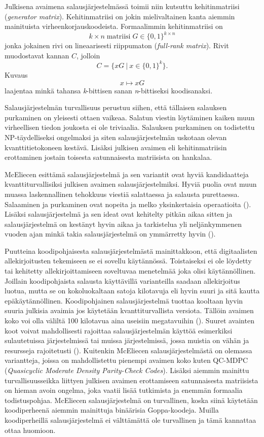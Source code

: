 Julkisena avaimena salausjärjestelmässä toimii niin kutsuttu kehitinmatriisi (\emph{generator matrix}). Kehitinmatriisi on jokin mielivaltainen kanta aiemmin mainituista virheenkorjauskoodeista. Formaalimmin kehitinmatriisi on 
\[k \times n  \; \text{matriisi} \; G \in \big\{0,1\big\}^{k \times n}\]
jonka jokainen rivi on lineaarisesti riippumaton (\emph{full-rank matrix}). Rivit muodostavat kannan $C$, jolloin 
\[C = \big\{ xG \: | \: x \in \big\{0,1\big\}^k \big\}.\]
Kuvaus
\[x \mapsto xG\]
laajentaa minkä tahansa \emph{k}-bittisen sanan \emph{n}-bittiseksi koodisanaksi.

Salausjärjestelmän turvallisuus perustuu siihen, että tällaisen salauksen purkaminen on yleisesti ottaen vaikeaa. Salatun viestin löytäminen kaiken muun virheellisen tiedon joukosta ei ole triviaalia. Salauksen purkaminen on todistettu NP-täydelliseksi ongelmaksi ja siten salausjärjestelmän uskotaan olevan kvanttitietokoneen kestävä. Lisäksi julkisen avaimen eli kehitinmatriisin erottaminen jostain toisesta satunnaisesta matriisista on hankalaa.

McEliecen esittämä salausjärjestelmä ja sen variantit ovat hyviä kandidaatteja kvanttiturvallisiksi julkisen avaimen salausjärjestelmiksi. Hyviä puolia ovat muun muassa laskennallinen tehokkuus viestiä salattaessa ja salausta purettaessa. Salaaminen ja purkaminen ovat nopeita ja melko yksinkertaisia operaatioita (\cite{mavroeidis2018impact}). Lisäksi salausjärjestelmä ja sen ideat ovat kehitelty pitkän aikaa sitten ja salausjärjestelmä on kestänyt hyvin aikaa ja tarkistelua yli neljänkymmenen vuoden ajan minkä takia salausjärjestelmä on ymmärretty hyvin (\cite{8012331}).

Puutteina koodipohjaisesta salausjärjestelmästä mainittakkoon, että digitaalisten allekirjoitusten tekemiseen se ei sovellu käytännössä. Toistaiseksi ei ole löydetty tai kehitetty allekirjoittamiseen soveltuvaa menetelmää joka olisi käytännöllinen. Joillain koodipohjaista salausta käyttävillä varianteilla saadaan allekirjoitus luotua, mutta se on kokoluokaltaan satoja kilotavuja eli hyvin suuri ja sitä kautta epäkäytännöllinen. Koodipohjainen salausjärjestelmä tuottaa kooltaan hyvin suuria julkisia avaimia jos käytetään kvanttiturvallista versiota. Tällöin avaimen koko voi olla väliltä 100 kilotavua aina useisiin megatavuihin (\cite{mavroeidis2018impact}). Suuret avainten koot voivat mahdollisesti rajoittaa salausjärjestelmän käyttöä esimerkiksi sulautetuissa järjestelmissä tai muissa järjestelmissä, jossa muistia on vähän ja resursseja rajoitetusti (\cite{8012331}). Kuitenkin McEliecen salausjärjestelmästä on olemassa variantteja, joissa on mahdollistettu pienempi avaimen koko kuten QC-MDPC (\emph{Quasicyclic Moderate Density Parity-Check Codes}). Lisäksi aiemmin mainittu turvallisuusseikka liittyen julkisen avaimen erottamiseen satunnaisesta matriisista on hieman avoin ongelma, joka vaatii lisää tutkimista ja enemmän formaalia todistuspohjaa. McEliecen salausjärjestelmä on turvallinen, koska siinä käytetään koodiperheenä aiemmin mainittuja binäärisia Goppa-koodeja. Muilla koodiperheillä salausjärjestelmä ei välttämättä ole turvallinen ja tämä kannattaa ottaa huomioon.


